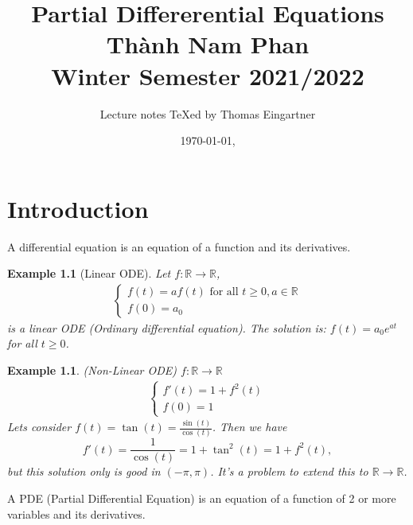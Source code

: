 \documentclass{report}
\title{Partial Differerential Equations \\ Thành Nam Phan \\ Winter Semester 2021/2022}
\author{Lecture notes \TeX{}ed by Thomas Eingartner}
\date{\today, \currenttime}
\theoremstyle{tommy}
\newtheorem{eg}[defn]{Example}
\begin{document}
\maketitle
\tableofcontents
\newpage



\chapter{Introduction}

A differential equation is an equation of a function and its derivatives. 

\begin{eg}[Linear ODE]
  Let \(f: \mathbb{R} \to \mathbb{R}\),
  \begin{align*}
    \begin{cases}
      f(t) = a f(t) \text{ for all } t \ge 0, a \in \mathbb{R} \\
      f(0) = a_0
    \end{cases}
  \end{align*}
  is a linear ODE (Ordinary differential equation). The solution is: \(f(t) = a_0 e^{at}\) for all \(t \ge 0\).
\end{eg}

\begin{eg} (Non-Linear ODE) \(f: \mathbb{R} \to \mathbb{R}\)
  \begin{align*}
    \begin{cases}
      f'(t) = 1 + f^2(t) \\
      f(0) = 1
    \end{cases}
  \end{align*}
  Lets consider \(f(t) = \tan(t) = \frac{\sin(t)}{\cos(t)}\). Then we have \[f'(t) = \frac{1}{\cos(t)} = 1 + \tan^2(t) = 1 + f^2(t),\] but this solution only is \emph{good} in \((- \pi, \pi)\). It's a problem to extend this to \(\mathbb{R} \to \mathbb{R}\).
\end{eg}

A PDE (Partial Differential Equation) is an equation of a function of 2 or more variables and its derivatives.
\end{document}
